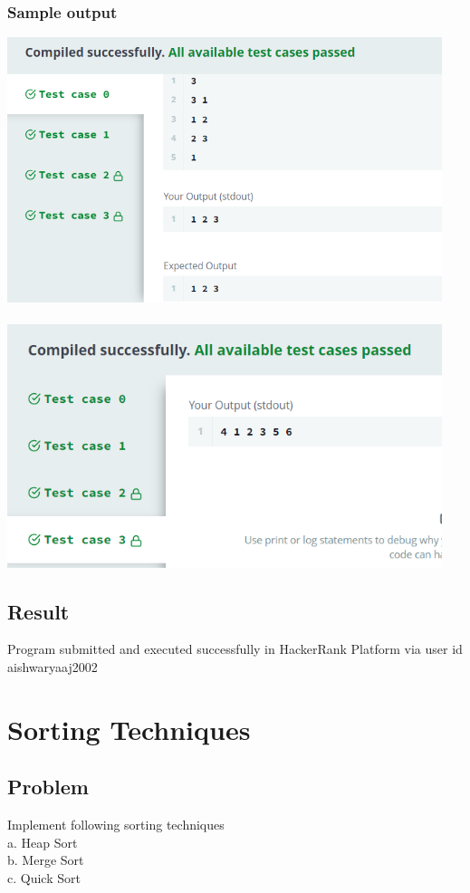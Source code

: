\documentclass[14pt, letterpaper]{article}
\begin{document}
\subsubsection{Sample output}
\includegraphics[width=5in]{bfs.png}\\ \\
\includegraphics[width=5in]{bfs2.png}
\subsection{Result}
Program submitted and executed successfully in HackerRank Platform via user id aishwaryaaj2002
\newpage
\section{Sorting Techniques}

\subsection{Problem}
Implement following sorting techniques\\
a. Heap Sort\\
b. Merge Sort\\
c. Quick Sort
\end{document}
